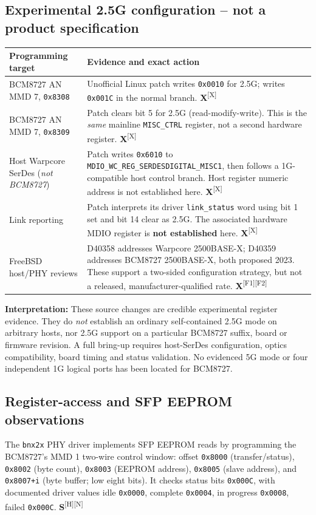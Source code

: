 \documentclass[10pt,a4paper]{article}
\newcommand{\m}[1]{\textsf{\color{blue}\bfseries #1}}
\newcommand{\src}[1]{\textsuperscript{[#1]}}
\begin{document}
\subsection{Experimental 2.5G configuration -- not a product specification}
\begin{tabularx}{\linewidth}{@{}p{42mm}X@{}}\toprule
\textbf{Programming target} & \textbf{Evidence and exact action}\\\midrule
BCM8727 AN MMD 7, \texttt{0x8308} & Unofficial Linux patch writes \texttt{0x0010} for 2.5G; writes \texttt{0x001C} in the normal branch. \m{X}\src{X}\\
BCM8727 AN MMD 7, \texttt{0x8309} & Patch clears bit 5 for 2.5G (read-modify-write). This is the \emph{same} mainline \texttt{MISC\_CTRL} register, not a second hardware register. \m{X}\src{X}\\
Host Warpcore SerDes (\emph{not BCM8727}) & Patch writes \texttt{0x6010} to \texttt{MDIO\_WC\_REG\_SERDESDIGITAL\_MISC1}, then follows a 1G-compatible host control branch. Host register numeric address is not established here. \m{X}\src{X}\\
Link reporting & Patch interprets its driver \texttt{link\_status} word using bit 1 set and bit 14 clear as 2.5G. The associated hardware MDIO register is \textbf{not established} here. \m{X}\src{X}\\
FreeBSD host/PHY reviews & D40358 addresses Warpcore 2500BASE-X; D40359 addresses BCM8727 2500BASE-X, both proposed 2023. These support a two-sided configuration strategy, but not a released, manufacturer-qualified rate. \m{X}\src{F1}\src{F2}\\
\bottomrule\end{tabularx}
\textbf{Interpretation:} These source changes are credible experimental register evidence. They do \emph{not} establish an ordinary self-contained 2.5G mode on arbitrary hosts, nor 2.5G support on a particular BCM8727 suffix, board or firmware revision. A full bring-up requires host-SerDes configuration, optics compatibility, board timing and status validation. No evidenced 5G mode or four independent 1G logical ports has been located for BCM8727.

\subsection{Register-access and SFP EEPROM observations}
The \texttt{bnx2x} PHY driver implements SFP EEPROM reads by programming the BCM8727's MMD 1 two-wire control window: offset \texttt{0x8000} (transfer/status), \texttt{0x8002} (byte count), \texttt{0x8003} (EEPROM address), \texttt{0x8005} (slave address), and \texttt{0x8007+i} (byte buffer; low eight bits). It checks status bits \texttt{0x000C}, with documented driver values idle \texttt{0x0000}, complete \texttt{0x0004}, in progress \texttt{0x0008}, failed \texttt{0x000C}. \m{S}\src{H}\src{N}
\end{document}
